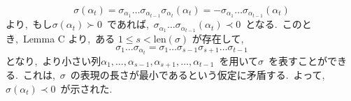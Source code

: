 \documentclass[uplatex,dvipdfmx]{jsarticle}
\begin{document}
\begin{myproof}
    \begin{equation*}
        \sigma(\alpha_t) = \sigma_{\alpha_1} \dots \sigma_{\alpha_{t-1}}\sigma_{\alpha_t}(\alpha_t) = -\sigma_{\alpha_1} \dots \sigma_{\alpha_{t-1}}(\alpha_t) 
    \end{equation*}
    より,~もし$\sigma(\alpha_t) \succ 0$~であれば,~$\sigma_{\alpha_1} \dots \sigma_{\alpha_{t-1}}(\alpha_t) \prec 0$~となる.~このとき,~Lemma C より,~ある $1 \le s < \text{len}(\sigma)$ が存在して,~
    \begin{equation*}
        \sigma_1 \dots \sigma_{\alpha_t} = \sigma_1 \dots \sigma_{s-1} \sigma_{s+1} \dots \sigma_{t-1}
    \end{equation*}
    となり,~より小さい列$\alpha_1, \dots, \alpha_{s-1}, \alpha_{s+1}, \dots, \alpha_{t-1}$~を用いて$\sigma$~を表すことができる.~これは,~$\sigma$~の表現の長さが最小であるという仮定に矛盾する.~よって,~$\sigma(\alpha_t) \prec 0$~が示された.
\end{myproof}
\newpage
\end{document}
